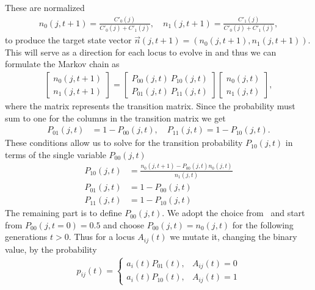 These are normalized
\begin{align}
  n_0(j, t+1) = \frac{C'_0(j)}{C'_0(j) + C'_1(j)}, \quad n_1(j, t+1) = \frac{C'_1(j)}{C'_0(j) + C'_1(j)},
  \label{eq:target_states}
\end{align}
to produce the target state vector $\vec{n}(j,t+1)=(n_0(j, t+1), n_1(j, t+1))$.  This will serve as a direction for each locus to evolve in and thus we can formulate the Markov chain as
\begin{align*}
  \begin{bmatrix}
    n_0(j, t+1) \\
    n_1(j, t+1)
  \end{bmatrix}
  = 
  \begin{bmatrix}
    P_{00}(j,t) \ P_{10}(j,t) \\
    P_{01}(j,t) \ P_{11}(j,t)
  \end{bmatrix}
  \begin{bmatrix}
    n_0(j, t) \\
    n_1(j, t)
  \end{bmatrix},
\end{align*}
where the matrix represents the transition matrix. Since the probability must sum to one for the columns in the transition matrix we get 
\begin{align*}
  P_{01}(j,t) &= 1 - P_{00}(j,t), \quad P_{11}(j,t) = 1 - P_{10}(j,t).
\end{align*}
These conditions allow us to solve for the transition probability $P_{10}(j,t)$ in terms of the single variable $P_{00}(j,t)$
\begin{align}
  P_{10}(j,t) &= \frac{n_0(j, t+1) - P_{00}(j,t)n_0(j, t)}{n_1(j,t)}  \label{eq:trans_prop_p10}\\
  P_{01}(j,t) &= 1 - P_{00}(j,t) \label{eq:trans_prop_p01} \\
  P_{11}(j,t) &= 1 - P_{10}(j,t) \label{eq:trans_prop_p11}
\end{align}
The remaining part is to define $P_{00}(j,t)$. We adopt the choice from~\cite{Wang2010} and start from $P_{00}(j, t = 0) = 0.5$ and choose $P_{00}(j,t) = n_0(j,t)$ for the following generations $t>0$. Thus for a locus $A_{ij}(t)$ we mutate it, changing the binary value, by the probability
\begin{align}
  p_{ij}(t) = 
  \begin{cases}
    a_i(t)P_{01}(t), &A_{ij}(t) = 0 \\
    a_i(t)P_{10}(t), &A_{ij}(t) = 1
  \end{cases}
  \label{eq:p_flip}
\end{align}
